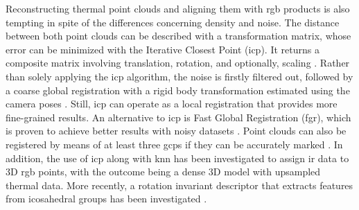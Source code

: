 Reconstructing thermal point clouds and aligning them with \acrshort{rgb} products is also tempting in spite of the differences concerning density and noise. The distance between both point clouds can be described with a transformation matrix, whose error can be minimized with the Iterative Closest Point (\acrshort{icp}). It returns a composite matrix involving translation, rotation, and optionally, scaling \cite{hoegner_mobile_2018, webster_three-dimensional_2018, clarkson_thermal_2017}. Rather than solely applying the \acrshort{icp} algorithm, the noise is firstly filtered out, followed by a coarse global registration with a rigid body transformation estimated using the camera poses \cite{truong_registration_2017}. Still, \acrshort{icp} can operate as a local registration that provides more fine-grained results. An alternative to \acrshort{icp} is Fast Global Registration (\acrshort{fgr}), which is proven to achieve better results with noisy datasets \cite{lin_fusion_2019}. Point clouds can also be registered by means of at least three \acrshort{gcp}s if they can be accurately marked \cite{dahaghin_3d_2019}. In addition, the use of \acrshort{icp} along with \acrshort{knn} has been investigated to assign \acrshort{ir} data to 3D \acrshort{rgb} points, with the outcome being a dense 3D model with upsampled thermal data. More recently, a rotation invariant descriptor that extracts features from icosahedral groups has been investigated \cite{wang_you_2022}.

